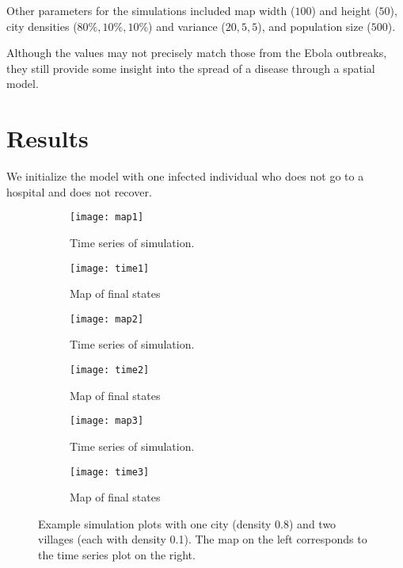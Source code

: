 Other parameters for the simulations included map width ($100$) and height ($50$), city densities ($80\%, 10\%, 10\%$) and variance ($20,5,5$), and population size ($500$).

Although the values may not precisely match those from the Ebola outbreaks, they still provide some insight into the spread of a disease through a spatial model.


\section{Results}

We initialize the model with one infected individual who does not go to a hospital and does not recover. 

\begin{figure}
\centering
\begin{subfigure}[t]{0.38\textwidth}
  \texttt{[image: map1]} 
  \caption{Time series of simulation.}
\end{subfigure}
\begin{subfigure}[t]{0.56\textwidth}
  \texttt{[image: time1]}
  \caption{Map of final states}
\end{subfigure}
\begin{subfigure}[t]{0.38\textwidth}
  \texttt{[image: map2]} 
  \caption{Time series of simulation.}
\end{subfigure}
\begin{subfigure}[t]{0.56\textwidth}
  \texttt{[image: time2]}
  \caption{Map of final states}
\end{subfigure}
\begin{subfigure}[t]{0.38\textwidth}
  \texttt{[image: map3]} 
  \caption{Time series of simulation.}
\end{subfigure}
\begin{subfigure}[t]{0.56\textwidth}
  \texttt{[image: time3]}
  \caption{Map of final states}
\end{subfigure}
\caption{Example simulation plots with one city (density 0.8) and two villages (each with density 0.1). The map on the left corresponds to the time series plot on the right.}
\end{figure}
